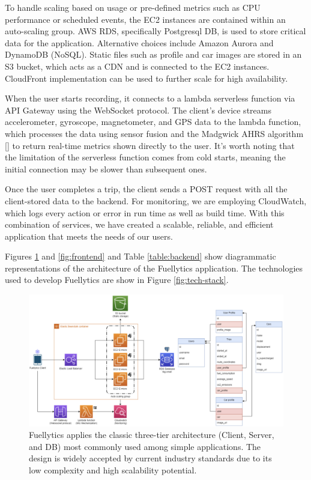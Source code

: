 \documentclass[11pt, oneside]{article}
\newcounter{refno}
\newcommand{\reflabel}[1]{\refstepcounter{refno}\label{#1}[\arabic{refno}]}  %
\begin{document}
To handle scaling based on usage or pre-defined metrics such as CPU performance or scheduled events, the EC2 instances are contained within an auto-scaling group. AWS RDS, specifically Postgresql DB, is used to store critical data for the application. Alternative choices include Amazon Aurora and DynamoDB (NoSQL). Static files such as profile and car images are stored in an S3 bucket, which acts as a CDN and is connected to the EC2 instances. CloudFront implementation can be used to further scale for high availability.

When the user starts recording, it connects to a lambda serverless function via API Gateway using the WebSocket protocol. The client's device streams accelerometer, gyroscope, magnetometer, and GPS data to the lambda function, which processes the data using sensor fusion and the Madgwick AHRS algorithm \reflabel{madgwick} to return real-time metrics shown directly to the user. It's worth noting that the limitation of the serverless function comes from cold starts, meaning the initial connection may be slower than subsequent ones.

Once the user completes a trip, the client sends a POST request with all the client-stored data to the backend. For monitoring, we are employing CloudWatch, which logs every action or error in run time as well as build time. With this combination of services, we have created a scalable, reliable, and efficient application that meets the needs of our users.

Figures \ref{fig:architecture} and \ref{fig:frontend} and Table \ref{table:backend} show diagrammatic representations of the architecture of the Fuellytics application.  The technologies used to develop Fuellytics are show in Figure \ref{fig:tech-stack}.

\begin{figure}[!htb]
\centerline{\includegraphics[width=19cm]{img/architecture/architecture-aws.png}}
\caption{\label{fig:architecture}Fuellytics applies the classic three-tier architecture (Client, Server, and DB) most commonly used among simple applications. The design is widely accepted by current industry standards due to its low complexity and high scalability potential.}
\end{figure}
\end{document}
